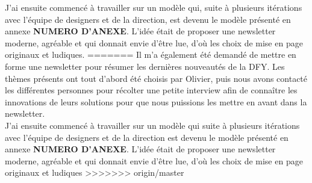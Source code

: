 J'ai ensuite commencé à travailler sur un modèle qui, suite à plusieurs itérations avec
l’équipe de designers et de la direction, est devenu le modèle présenté en annexe \textbf{NUMERO D'ANEXE}. L'idée était de proposer une newsletter moderne, agréable et qui donnait envie d'être lue, d'où les choix de mise en page originaux et ludiques.
=======
Il m'a également été demandé de mettre en forme une newsletter pour résumer les dernières nouveautés de la DFY. Les thèmes présents ont tout d'abord été choisis par Olivier, puis nous avons contacté les différentes personnes pour récolter une petite interview afin de connaître les innovations de leurs solutions pour que nous puissions les mettre en avant dans la newsletter.\\

J'ai ensuite commencé à travailler sur un modèle qui suite à plusieurs itérations avec l'équipe de designers et de la direction est devenu le modèle présenté en annexe \textbf{NUMERO D'ANEXE}. L'idée était de proposer une newsletter moderne, agréable et qui donnait envie d'être lue, d'où les choix de mise en page originaux et ludiques
>>>>>>> origin/master




